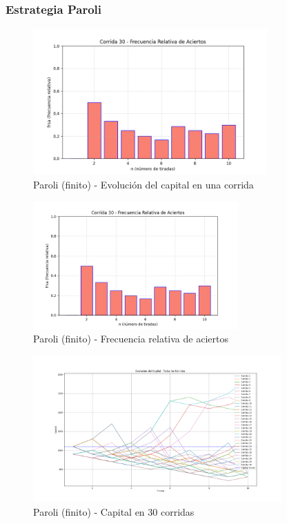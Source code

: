 \documentclass{article}
\begin{document}
\subsubsection*{Estrategia Paroli}


\begin{figure}[H]
    \centering
    \includegraphics[width=0.8\textwidth]{./images/frsa_corrida_30_p_f.png}
    \caption{Paroli (finito) - Evolución del capital en una corrida}
\end{figure}

\begin{figure}[H]
    \centering
    \includegraphics[width=0.7\textwidth]{./images/frsa_corrida_30_p_f.png}
    \caption{Paroli (finito) - Frecuencia relativa de aciertos}
\end{figure}

\begin{figure}[H]
    \centering
    \includegraphics[width=0.85\textwidth]{./images/capital_todas_corridas_p_f.png}
    \caption{Paroli (finito) - Capital en 30 corridas}
\end{figure}
\end{document}
